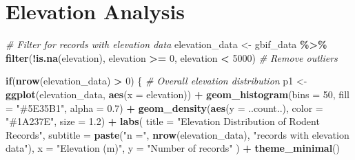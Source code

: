 \documentclass[
]{article}
\newenvironment{Shaded}{\begin{snugshade}}{\end{snugshade}}
\newcommand{\AttributeTok}[1]{\textcolor[rgb]{0.13,0.29,0.53}{#1}}
\newcommand{\CommentTok}[1]{\textcolor[rgb]{0.56,0.35,0.01}{\textit{#1}}}
\newcommand{\ControlFlowTok}[1]{\textcolor[rgb]{0.13,0.29,0.53}{\textbf{#1}}}
\newcommand{\DecValTok}[1]{\textcolor[rgb]{0.00,0.00,0.81}{#1}}
\newcommand{\FloatTok}[1]{\textcolor[rgb]{0.00,0.00,0.81}{#1}}
\newcommand{\FunctionTok}[1]{\textcolor[rgb]{0.13,0.29,0.53}{\textbf{#1}}}
\newcommand{\NormalTok}[1]{#1}
\newcommand{\OtherTok}[1]{\textcolor[rgb]{0.56,0.35,0.01}{#1}}
\newcommand{\SpecialCharTok}[1]{\textcolor[rgb]{0.81,0.36,0.00}{\textbf{#1}}}
\newcommand{\StringTok}[1]{\textcolor[rgb]{0.31,0.60,0.02}{#1}}
\begin{document}
\section{Elevation Analysis}\label{elevation-analysis}

\begin{Shaded}
\begin{Highlighting}[]
\CommentTok{\# Filter for records with elevation data}
\NormalTok{elevation\_data }\OtherTok{\textless{}{-}}\NormalTok{ gbif\_data }\SpecialCharTok{\%\textgreater{}\%}
  \FunctionTok{filter}\NormalTok{(}\SpecialCharTok{!}\FunctionTok{is.na}\NormalTok{(elevation), elevation }\SpecialCharTok{\textgreater{}=} \DecValTok{0}\NormalTok{, elevation }\SpecialCharTok{\textless{}} \DecValTok{5000}\NormalTok{)  }\CommentTok{\# Remove outliers}

\ControlFlowTok{if}\NormalTok{(}\FunctionTok{nrow}\NormalTok{(elevation\_data) }\SpecialCharTok{\textgreater{}} \DecValTok{0}\NormalTok{) \{}
  \CommentTok{\# Overall elevation distribution}
\NormalTok{  p1 }\OtherTok{\textless{}{-}} \FunctionTok{ggplot}\NormalTok{(elevation\_data, }\FunctionTok{aes}\NormalTok{(}\AttributeTok{x =}\NormalTok{ elevation)) }\SpecialCharTok{+}
    \FunctionTok{geom\_histogram}\NormalTok{(}\AttributeTok{bins =} \DecValTok{50}\NormalTok{, }\AttributeTok{fill =} \StringTok{"\#5E35B1"}\NormalTok{, }\AttributeTok{alpha =} \FloatTok{0.7}\NormalTok{) }\SpecialCharTok{+}
    \FunctionTok{geom\_density}\NormalTok{(}\FunctionTok{aes}\NormalTok{(}\AttributeTok{y =}\NormalTok{ ..count..), }\AttributeTok{color =} \StringTok{"\#1A237E"}\NormalTok{, }\AttributeTok{size =} \FloatTok{1.2}\NormalTok{) }\SpecialCharTok{+}
    \FunctionTok{labs}\NormalTok{(}
      \AttributeTok{title =} \StringTok{"Elevation Distribution of Rodent Records"}\NormalTok{,}
      \AttributeTok{subtitle =} \FunctionTok{paste}\NormalTok{(}\StringTok{"n ="}\NormalTok{, }\FunctionTok{nrow}\NormalTok{(elevation\_data), }\StringTok{"records with elevation data"}\NormalTok{),}
      \AttributeTok{x =} \StringTok{"Elevation (m)"}\NormalTok{, }\AttributeTok{y =} \StringTok{"Number of records"}
\NormalTok{    ) }\SpecialCharTok{+}
    \FunctionTok{theme\_minimal}\NormalTok{()}
  

\end{Highlighting}
\end{Shaded}
\end{document}
